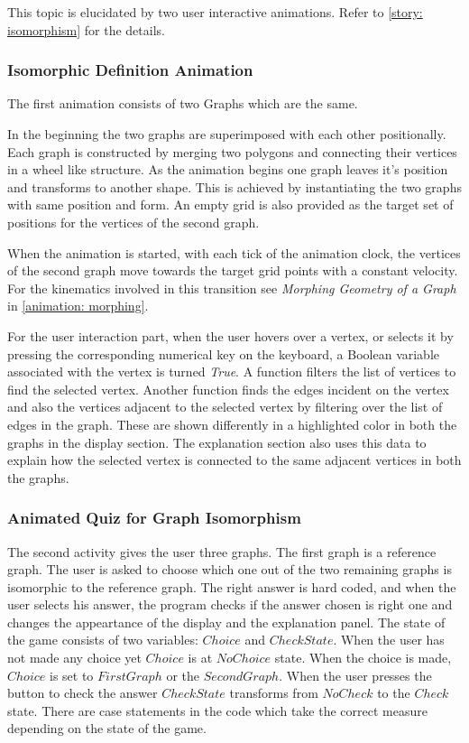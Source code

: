 This topic is elucidated by two user interactive animations. Refer to
\autoref{story: isomorphism} for the details. 


\subsubsection{Isomorphic Definition Animation}
The first animation consists of two
Graphs which are the same.

In the beginning the two graphs are superimposed with each other positionally.
Each graph is constructed by merging two polygons and connecting their vertices
in a wheel like structure.
As the animation begins one graph leaves it's position and transforms to
another shape.  This is achieved by instantiating the two graphs with same
position and form. An empty grid is also provided as the target set of
positions for the vertices of the second graph. 

When the animation is started, with each tick of the animation clock, the
vertices of the second graph move towards the target grid points with a
constant velocity. For the kinematics involved in this transition see
\emph{Morphing Geometry of a Graph} in \autoref{animation: morphing}.

For the user interaction part, when the user hovers over a vertex, or selects
it by pressing the corresponding numerical key on the keyboard, a Boolean
variable associated with the vertex is turned \emph{True}. A function filters
the list of vertices to find the selected vertex. Another function finds the
edges incident on the vertex and also the vertices adjacent to the selected
vertex by filtering over the list of edges in the graph. These are shown
differently in a highlighted color in both the graphs in the display section.
The explanation section also uses this data to explain how the selected vertex
is connected to the same adjacent vertices in both the graphs.

\subsubsection{Animated Quiz for Graph Isomorphism}
The second activity gives the user three graphs. The first graph is a reference
graph. The user is asked to choose which one out of the two remaining graphs is
isomorphic to the reference graph. The right answer is hard coded, and when the
user selects his answer, the program checks if the answer chosen is right one
and changes the appeartance of the display and the explanation panel.  The
state of the game consists of two variables: $Choice$ and $CheckState$.  When
the user has not made any choice yet $Choice$ is at $NoChoice$ state.  When the
choice is made, $Choice$ is set to $FirstGraph$ or the $SecondGraph$.  When the
user presses the button to check the answer $CheckState$ transforms from
$NoCheck$ to the $Check$ state.  There are case statements in the code which
take the correct measure depending on the state of the game.

